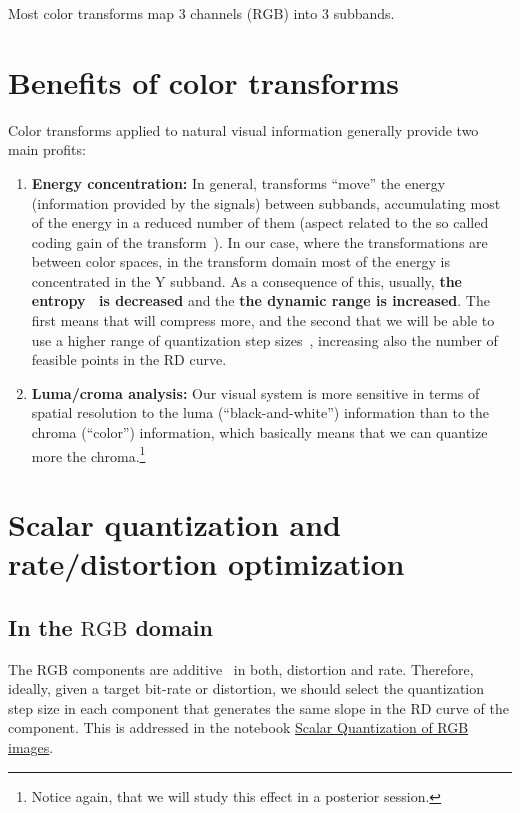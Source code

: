 Most color transforms map 3 channels ($\text{RGB}$) into 3 subbands.

\section{Benefits of color transforms}

Color transforms applied to natural visual information generally
provide two main profits:
\begin{enumerate}
\item \textbf{Energy concentration:} In general, transforms ``move''
  the energy (information provided by the signals) between subbands,
  accumulating most of the energy in a reduced number of them (aspect
  related to the so called coding gain of the
  transform~\cite{vruiz__transform_coding}). In our case, where the
  transformations are between color spaces, in the transform domain
  most of the energy is concentrated in the $\text{Y}$ subband. As a
  consequence of this, usually, \textbf{the
    entropy~\cite{vruiz__information_theory} is decreased} and the
  \textbf{the dynamic range is increased}. The first means that will
  compress more, and the second that we will be able to use a higher
  range of quantization step
  sizes~\cite{vruiz__scalar_quantization,sayood2017introduction},
  increasing also the number of feasible points in the RD curve.
\item \textbf{Luma/croma analysis:} Our visual system is more
  sensitive in terms of spatial resolution to the luma
  (``black-and-white'') information than to the chroma (``color'')
  information, which basically means that we can quantize more the
  chroma.\footnote{Notice again, that we will study this effect in a
  posterior session.}
\end{enumerate}

\section{Scalar quantization and rate/distortion optimization}

\subsection{In the $\text{RGB}$ domain}

The $\text{RGB}$ components are additive~\cite{burger2016digital} in
both, distortion and rate. Therefore, ideally, given a target bit-rate
or distortion, we should select the quantization step size in each
component that generates the same slope in the RD curve of the
component. This is addressed in the notebook
\href{https://github.com/vicente-gonzalez-ruiz/color_transforms/blob/main/docs/RGB/RGB_SQ.ipynb}{Scalar
  Quantization of RGB images}.

